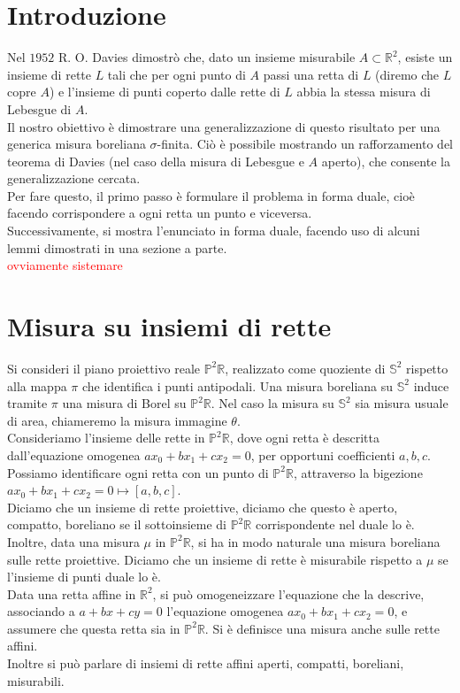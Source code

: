 \documentclass[a4paper, twoside,openright]{article}
\newcommand{\R}{\mathbb{R}}
\renewcommand{\P}{\mathbb{P}}
\renewcommand{\S}{\mathbb{S}}
\newcommand{\<}{\langle}
\renewcommand{\>}{\rangle}
\begin{document}


\tableofcontents
\clearpage

\section{Introduzione}
	 Nel $1952$ R. O. Davies dimostrò che, dato un insieme misurabile $A \subset \mathbb{R}^{2}$, esiste un insieme di rette $L$ tali che per ogni punto di $A$ passi una retta di $L$ (diremo che $L$ copre $A$) e l'insieme di punti coperto dalle rette di $L$ abbia la stessa misura di Lebesgue di $A$.\\
	 Il nostro obiettivo è dimostrare una generalizzazione di questo risultato per una generica misura boreliana $\sigma$-finita.
	 Ciò è possibile mostrando un rafforzamento del teorema di Davies (nel caso della misura di Lebesgue e $A$ aperto), che consente la generalizzazione cercata.\\
	 Per fare questo, il primo passo è formulare il problema in forma duale, cioè facendo corrispondere a ogni retta un punto e viceversa.\\
	 Successivamente, si mostra l'enunciato in forma duale, facendo uso di alcuni lemmi dimostrati in una sezione a parte.\\
	
	\textcolor{red}{ovviamente sistemare}
	\newpage


\section{Misura su insiemi di rette}

Si consideri il piano proiettivo reale $\P^2 \R$, realizzato come quoziente di $\S^2$ rispetto alla mappa $\pi$ che identifica i punti antipodali. Una misura boreliana su $\S^2$ induce tramite $\pi$ una misura di Borel su $\P^2\R$. Nel caso la misura su $\S^2$ sia misura usuale di area, chiameremo la misura immagine $\theta$.\\
Consideriamo l'insieme delle rette in $\P^2 \R$, dove ogni retta è descritta dall'equazione omogenea $ax_0+bx_1+cx_2=0$, per opportuni coefficienti $a,b,c$.\\
Possiamo identificare ogni retta con un punto di $\P^2 \R$, attraverso la bigezione $ax_0+bx_1+cx_2=0 \mapsto [a,b,c]$.\\
Diciamo che un insieme di rette proiettive, diciamo che questo è aperto, compatto, boreliano se il sottoinsieme di $\P^2 \R$ corrispondente nel duale lo è.\\
Inoltre, data una misura $\mu$ in $\P^2 \R$, si ha in modo naturale una misura boreliana sulle rette proiettive. Diciamo che un insieme di rette è misurabile rispetto a $\mu$ se l'insieme di punti duale lo è.\\
Data una retta affine in $\R^2$, si può omogeneizzare l'equazione che la descrive, associando a $a+bx+cy=0$ l'equazione omogenea $ax_0+bx_1+cx_2=0$, e assumere che questa retta sia in $\P^2 \R$. Si è definisce una misura anche sulle rette affini.\\
Inoltre si può parlare di insiemi di rette affini aperti, compatti, boreliani, misurabili.
\end{document}
